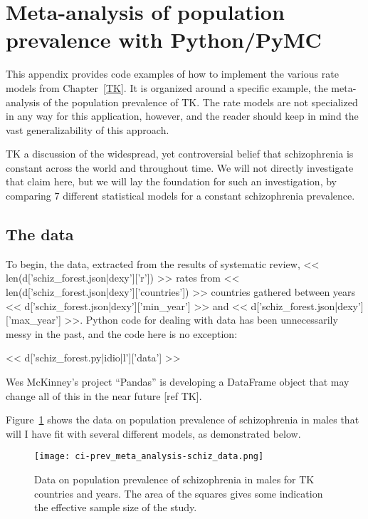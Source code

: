\section{Meta-analysis of population prevalence with Python/PyMC}

This appendix provides code examples of how to implement the various
rate models from Chapter~\ref{TK}.  It is organized around a specific
example, the meta-analysis of the population prevalence of TK.  The
rate models are not specialized in any way for this application,
however, and the reader should keep in mind the vast generalizability
of this approach.

TK a discussion of the widespread, yet controversial belief that
schizophrenia is constant across the world and throughout time.  We
will not directly investigate that claim here, but we will lay the
foundation for such an investigation, by comparing 7 different
statistical models for a constant schizophrenia prevalence.

\subsection{The data}
To begin, the data, extracted from the results of systematic review,
<< len(d['schiz_forest.json|dexy']['r']) >> rates from <<
len(d['schiz_forest.json|dexy']['countries']) >> countries gathered
between years << d['schiz_forest.json|dexy']['min_year'] >> and <<
d['schiz_forest.json|dexy']['max_year'] >>.  Python code for dealing
with data has been unnecessarily messy in the past, and the code here
is no exception:

<< d['schiz_forest.py|idio|l']['data'] >>

Wes McKinney's project ``Pandas'' is developing a DataFrame object
that may change all of this in the near future [ref TK].

Figure~\ref{fig:ci-prev_meta_analysis-schiz_data} shows the data on
population prevalence of schizophrenia in males that will I have fit with
several different models, as demonstrated below.

\begin{figure}
\begin{center}
\texttt{[image: ci-prev\_meta\_analysis-schiz\_data.png]}
\end{center}
\caption{Data on population prevalence of schizophrenia in males for
  TK countries and years.  The area of the squares gives some indication the
  effective sample size of the study.}
\label{fig:ci-prev_meta_analysis-schiz_data}
\end{figure}

